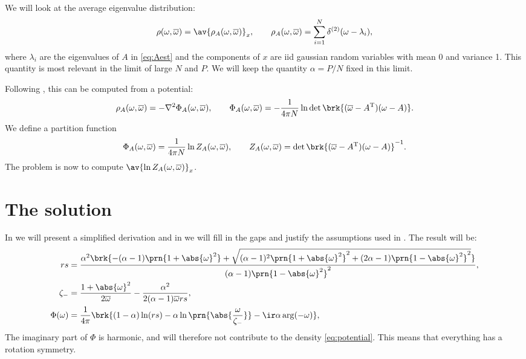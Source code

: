 \documentclass[12pt]{article}
\newcommand{\inv}{^{-1}}
\newcommand{\trans}{^\mathrm{T}}
\newcommand{\omb}{\overline{\omega}}
\newcommand{\opo}{\prn{1+\abs{\omega}^2}}
\newcommand{\omo}{\prn{1-\abs{\omega}^2}}
\begin{document}
We will look at the average eigenvalue distribution:
%
\begin{equation}\label{eq:eigdist}
  \rho(\omega,\omb) = \av{\rho_A(\omega,\omb)}_x,
  \qquad
  \rho_A(\omega,\omb) = \sum_{i=1}^N \delta^{(2)}(\omega-\lambda_i),
\end{equation}
%
where $\lambda_i$ are the eigenvalues of $A$ in \eqref{eq:Aest} and
the components of $x$ are iid gaussian random variables with mean 0 and variance 1.
This quantity is most relevant in the limit of large $N$ and $P$.
We will keep the quantity $\alpha=P/N$ fixed in this limit.

Following \cite{Sommers1988asymmetric}, this can be computed from a potential:
%
\begin{equation}\label{eq:potential}
  \rho_A(\omega,\omb) = -\nabla^2 \Phi_A(\omega,\omb),
  \qquad
  \Phi_A(\omega,\omb) = -\frac{1}{4\pi N} \ln\det \brk{(\omb-A\trans)(\omega-A)}.
\end{equation}
%
We define a partition function
%
\begin{equation}\label{eq:partfn}
  \Phi_A(\omega,\omb) = \frac{1}{4\pi N} \ln Z_A(\omega,\omb),
  \qquad
  Z_A(\omega,\omb) = \det \brk{(\omb-A\trans)(\omega-A)}\inv.
\end{equation}
%
The problem is now to compute $\av{\ln Z_A(\omega,\omb)}_x$.


\section{The solution}\label{sec:solution}

In  we will present a simplified derivation and in  we will fill in the gaps and justify the assumptions used in .
The result will be:
%
\begin{equation}\label{eq:phisol}
\begin{aligned}
  rs &= \frac{\alpha^2 \brk{ -(\alpha-1)\opo + \sqrt{ (\alpha-1)^2\opo^2 + (2\alpha-1)\omo^2 } }}{(\alpha-1)\omo^2},\\
  \zeta_- &= \frac{1+\abs{\omega}^2}{2\omb} - \frac{\alpha^2}{2(\alpha-1)\omb rs},\\
  \Phi(\omega) &= \frac{1}{4\pi}\brk{ (1-\alpha)\ln(rs) -\alpha\ln\prn{\abs{\frac{\omega}{\zeta_-}}} -\ir\alpha\arg(-\omega)},
\end{aligned}
\end{equation}
%
The imaginary part of $\Phi$ is harmonic, and will therefore not contribute to the density \eqref{eq:potential}.
This means that everything has a rotation symmetry.
\end{document}
